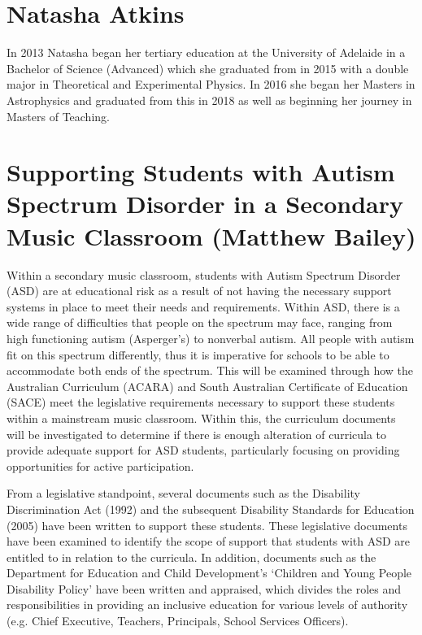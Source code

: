 \documentclass[twoside,12pt,a4paper,notitlepage]{memoir}
\begin{document}
\section*{Natasha Atkins}

In 2013 Natasha began her tertiary education at the University of Adelaide in a Bachelor of Science (Advanced) which she graduated from in 2015 with a double major in Theoretical and Experimental Physics. In 2016 she began her Masters in Astrophysics and graduated from this in 2018 as well as beginning her journey in Masters of Teaching.



\pagebreak
\section*{Supporting Students with Autism Spectrum Disorder in a Secondary Music Classroom (Matthew Bailey)}
\label{aut:bailey}

Within a secondary music classroom, students with Autism Spectrum Disorder (ASD) are at educational risk as a result of not having the necessary support systems in place to meet their needs and requirements. Within ASD, there is a wide range of difficulties that people on the spectrum may face, ranging from high functioning autism (Asperger’s) to nonverbal autism. All people with autism fit on this spectrum differently, thus it is imperative for schools to be able to accommodate both ends of the spectrum. This will be examined through how the Australian Curriculum (ACARA) and South Australian Certificate of Education (SACE) meet the legislative requirements necessary to support these students within a mainstream music classroom. Within this, the curriculum documents will be investigated to determine if there is enough alteration of curricula to provide adequate support for ASD students, particularly focusing on providing opportunities for active participation.

From a legislative standpoint, several documents such as the Disability Discrimination Act (1992) and the subsequent Disability Standards for Education (2005) have been written to support these students. These legislative documents have been examined to identify the scope of support that students with ASD are entitled to in relation to the curricula. In addition, documents such as the Department for Education and Child Development’s ‘Children and Young People Disability Policy’ have been written and appraised, which divides the roles and responsibilities in providing an inclusive education for various levels of authority (e.g. Chief Executive, Teachers, Principals, School Services Officers).
\end{document}
